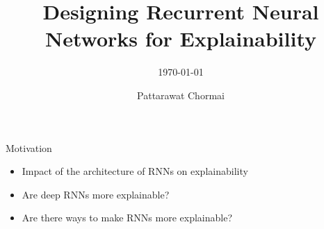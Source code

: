 \documentclass[Nike]{tuberlinbeamer}
\title{Designing Recurrent Neural Networks for Explainability}
\subtitle{\today}
\author[TU Berlin]{Pattarawat Chormai}
\institute{Technische Universität Berlin}
\begin{document}
\begin{frame}
\maketitle
\end{frame}




\begin{frame}{Motivation}

\begin{itemize}
	\item Impact of the architecture of RNNs on explainability
	\item Are deep RNNs more explainable? 
	\item Are there ways to make RNNs more explainable?
\end{itemize}
\end{frame}
\end{document}
